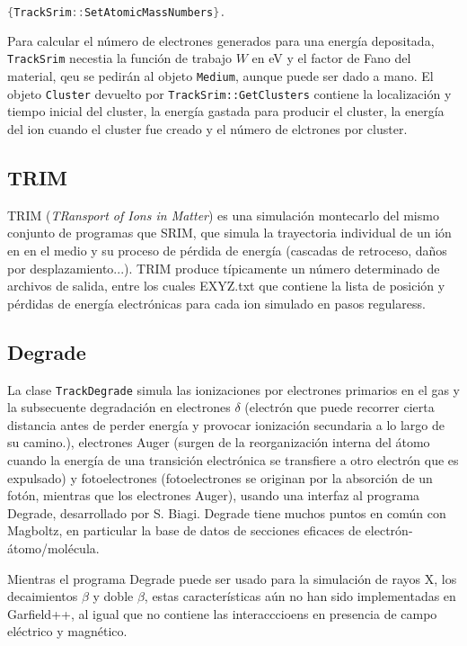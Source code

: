 \begin{lstlisting}[language=C++,style=c++]
{TrackSrim::SetAtomicMassNumbers}.
\end{lstlisting}
\vspace*{0.6em}


Para calcular el número de electrones generados para una energía depositada, \texttt{TrackSrim} necestia la función de trabajo $W$ en eV y el factor de Fano del material, qeu se pedirán al objeto \texttt{Medium}, aunque puede ser dado a mano. El objeto \texttt{Cluster} devuelto por \texttt{TrackSrim::GetClusters} contiene la localización y tiempo inicial del cluster, la energía gastada para producir el cluster, la energía del ion cuando el cluster fue creado y el número de elctrones por cluster. 

\subsection{TRIM}

TRIM (\textit{TRansport of Ions in Matter}) es una simulación montecarlo del mismo conjunto de programas que SRIM, que simula la trayectoria individual de un ión en en el medio y su proceso de pérdida de energía (cascadas de retroceso, daños por desplazamiento...). TRIM produce típicamente un número determinado de archivos de salida, entre los cuales EXYZ.txt que contiene la lista de posición y pérdidas de energía electrónicas para cada ion simulado en pasos regularess.

\subsection{Degrade}

La clase \texttt{TrackDegrade} simula las ionizaciones por electrones primarios en el gas y la subsecuente degradación en electrones $\delta$ (electrón que puede recorrer cierta distancia antes de perder energía y provocar ionización secundaria a lo largo de su camino.), electrones Auger (surgen de la reorganización interna del átomo cuando la energía de una transición electrónica se transfiere a otro electrón que es expulsado) y fotoelectrones (fotoelectrones se originan por la absorción de un fotón, mientras que los electrones Auger), usando una interfaz al programa Degrade, desarrollado por S. Biagi. Degrade tiene muchos puntos en común con Magboltz, en particular la base de datos de secciones eficaces de electrón-átomo/molécula. 

Mientras el programa Degrade puede ser usado para la simulación de rayos X, los decaimientos $\beta$ y doble $\beta$, estas características aún no han sido implementadas en Garfield++, al igual que no contiene las interacccioens en presencia de campo eléctrico y magnético. 


